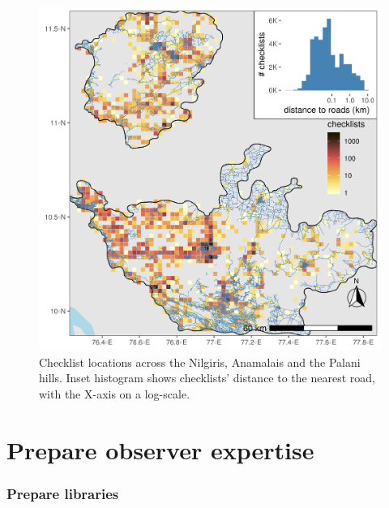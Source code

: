 \documentclass[]{article}
\begin{document}
\begin{figure}
\centering
\includegraphics{figs/fig_distRoads.png}
\caption{Checklist locations across the Nilgiris, Anamalais and the Palani hills. Inset histogram shows checklists' distance to the nearest road, with the X-axis on a log-scale.}
\end{figure}

\hypertarget{prepare-observer-expertise}{%
\section{Prepare observer expertise}\label{prepare-observer-expertise}}

\hypertarget{prepare-libraries-2}{%
\subsubsection{Prepare libraries}\label{prepare-libraries-2}}
\end{document}
